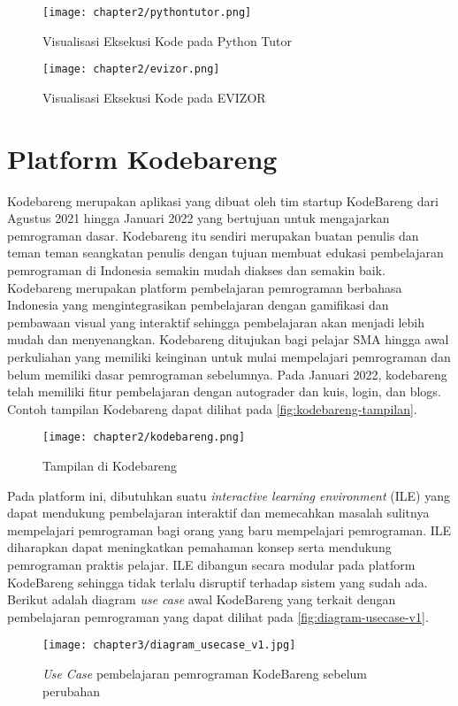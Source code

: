 \begin{figure}[H]
  \centering
  \texttt{[image: chapter2/pythontutor.png]}
  \caption{Visualisasi Eksekusi Kode pada Python Tutor} \label{fig:pythontutor}
\end{figure}

\begin{figure}[H]
  \centering
  \texttt{[image: chapter2/evizor.png]}
  \caption{Visualisasi Eksekusi Kode pada EVIZOR} \label{fig:evizor}
\end{figure}


\section{Platform Kodebareng}

Kodebareng merupakan aplikasi yang dibuat oleh tim startup KodeBareng dari Agustus 2021 hingga Januari 2022 yang bertujuan untuk mengajarkan pemrograman dasar. Kodebareng itu sendiri merupakan buatan penulis dan teman teman seangkatan penulis dengan tujuan membuat edukasi pembelajaran pemrograman di Indonesia semakin mudah diakses dan semakin baik. Kodebareng merupakan platform pembelajaran pemrograman berbahasa Indonesia yang mengintegrasikan pembelajaran dengan gamifikasi dan pembawaan visual yang interaktif sehingga pembelajaran akan menjadi lebih mudah dan menyenangkan. Kodebareng ditujukan bagi pelajar SMA hingga awal perkuliahan yang memiliki keinginan untuk mulai mempelajari pemrograman dan belum memiliki dasar pemrograman sebelumnya. Pada Januari 2022, kodebareng telah memiliki fitur pembelajaran dengan autograder dan kuis, login, dan blogs. Contoh tampilan Kodebareng dapat dilihat pada \autoref{fig:kodebareng-tampilan}.

\begin{figure}[h]
  \centering
  \texttt{[image: chapter2/kodebareng.png]}
  \caption{Tampilan di Kodebareng}\label{fig:kodebareng-tampilan}
\end{figure}

Pada platform ini, dibutuhkan suatu \textit{interactive learning environment} (ILE) yang dapat mendukung pembelajaran interaktif dan memecahkan masalah sulitnya mempelajari pemrograman bagi orang yang baru mempelajari pemrograman. ILE diharapkan dapat meningkatkan pemahaman konsep serta mendukung pemrograman praktis pelajar. ILE dibangun secara modular pada platform KodeBareng sehingga tidak terlalu disruptif terhadap sistem yang sudah ada. Berikut adalah diagram \textit{use case} awal KodeBareng yang terkait dengan pembelajaran pemrograman yang dapat dilihat pada \autoref{fig:diagram-usecase-v1}.

\begin{figure}[H]
  \centering
  \texttt{[image: chapter3/diagram\_usecase\_v1.jpg]}
  \caption{\textit{Use Case} pembelajaran pemrograman KodeBareng sebelum perubahan} \label{fig:diagram-usecase-v1}
\end{figure}

